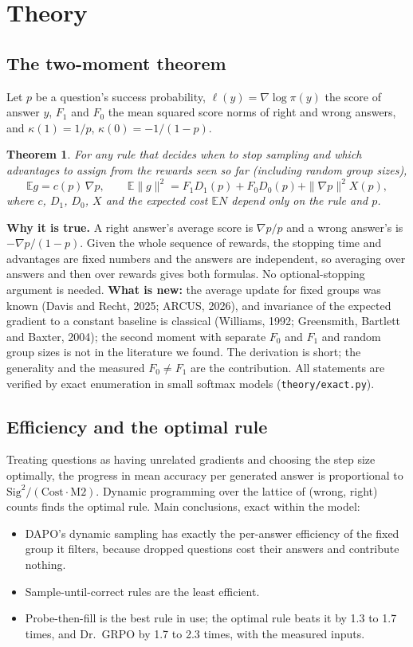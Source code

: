 \documentclass[11pt]{article}
\newtheorem{theorem}{Theorem}
\newcommand{\E}{\mathbb{E}}
\begin{document}
\section{Theory}

\subsection{The two-moment theorem}
Let $p$ be a question's success probability, $\ell(y)=\nabla\log\pi(y)$ the score of answer $y$, $F_1$ and $F_0$ the mean squared score norms of right and wrong answers, and $\kappa(1)=1/p$, $\kappa(0)=-1/(1-p)$.

\begin{theorem}
For any rule that decides when to stop sampling and which advantages to assign from the rewards seen so far (including random group sizes),
\[
\E g=c(p)\,\nabla p,\qquad \E\|g\|^2=F_1D_1(p)+F_0D_0(p)+\|\nabla p\|^2X(p),
\]
where $c$, $D_1$, $D_0$, $X$ and the expected cost $\E N$ depend only on the rule and $p$.
\end{theorem}
\textbf{Why it is true.} A right answer's average score is $\nabla p/p$ and a wrong answer's is $-\nabla p/(1-p)$. Given the whole sequence of rewards, the stopping time and advantages are fixed numbers and the answers are independent, so averaging over answers and then over rewards gives both formulas. No optional-stopping argument is needed. \textbf{What is new:} the average update for fixed groups was known (Davis and Recht, 2025; ARCUS, 2026), and invariance of the expected gradient to a constant baseline is classical (Williams, 1992; Greensmith, Bartlett and Baxter, 2004); the second moment with separate $F_0$ and $F_1$ and random group sizes is not in the literature we found. The derivation is short; the generality and the measured $F_0\neq F_1$ are the contribution. All statements are verified by exact enumeration in small softmax models (\texttt{theory/exact.py}).

\subsection{Efficiency and the optimal rule}
Treating questions as having unrelated gradients and choosing the step size optimally, the progress in mean accuracy per generated answer is proportional to $\mathrm{Sig}^2/(\mathrm{Cost}\cdot\mathrm{M2})$. Dynamic programming over the lattice of (wrong, right) counts finds the optimal rule. Main conclusions, exact within the model:
\begin{itemize}[leftmargin=*,itemsep=1pt]
\item DAPO's dynamic sampling has exactly the per-answer efficiency of the fixed group it filters, because dropped questions cost their answers and contribute nothing.
\item Sample-until-correct rules are the least efficient.
\item Probe-then-fill is the best rule in use; the optimal rule beats it by 1.3 to 1.7 times, and Dr.\ GRPO by 1.7 to 2.3 times, with the measured inputs.
\end{itemize}
\end{document}
